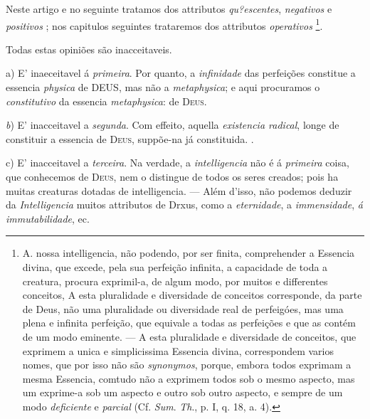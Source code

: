 Neste artigo e no seguinte tratamos dos attributos \emph{qu?escentes}, \emph{negativos} e \emph{positivos} ; nos capitulos seguintes trataremos dos attributos \emph{operativos} \footnote{A. nossa intelligencia, não podendo, por ser finita, comprehender a Essencia divina, que excede, pela sua perfeição infinita, a capacidade de toda a creatura, procura exprimil-a, de algum modo, por muitos e differentes conceitos, A esta pluralidade e diversidade de conceitos corresponde, da parte de Deus, não uma pluralidade ou diversidade real de perfeigóes, mas uma plena e infinita perfeição, que equivale a todas as perfeições e que as contém de um modo eminente. --- A esta pluralidade e diversidade de conceitos, que exprimem a unica e simplicissima Essencia divina, correspondem varios nomes, que por isso não são \emph{synonymos}, porque, embora todos exprimam a mesma Essencia, comtudo não a exprimem todos sob o mesmo aspecto, mas um exprime-a sob um aspecto e outro sob outro aspecto, e sempre de um modo \emph{deficiente} e \emph{parcial} (Cf. \emph{Sum}. \emph{Th}., p. I, q. 18, a. 4).}.

Todas estas opiniões são inacceitaveis.

a) E' inaeceitavel á \emph{primeira}. Por quanto, a \emph{infinidade} das perfeições constitue a essencia \emph{physica} de \textsc{DEUS}, mas não a \emph{metaphysica}; e aqui procuramos o \emph{constitutivo} da essencia \emph{metaphysica}: de \textsc{Deus}.

\emph{b}) E' inacceitavel a \emph{segunda}. Com effeito, aquella \emph{existencia radical}, longe de constituir a essencia de \textsc{Deus}, suppõe-na já constituida. .

c) E' inacceitavel a \emph{terceira}. Na verdade, a \emph{intelligencia} não é á \emph{primeira} coisa, que conhecemos de \textsc{Deus}, nem o distingue de todos os seres creados; pois ha muitas creaturas dotadas de intelligencia. --- Além d'isso, não podemos deduzir da \emph{Intelligencia} muitos attributos de Drxus, como a \emph{eternidade}, a \emph{immensidade}, \emph{á immutabilidade}, ec.

